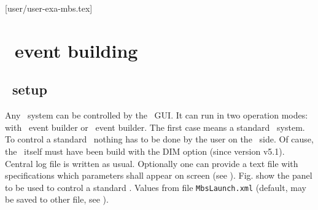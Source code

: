 [user/user-exa-mbs.tex]
\section[MBS event building]{\mbs\ event building}
\subsection[MBS setup]{\mbs\ setup}
Any \mbs\ system can be controlled by the \dabc\ GUI.
It can run in two operation modes: with \mbs\ event builder or \dabc\ event builder.
The first case means a standard \mbs\ system.
To control a standard \mbs\ nothing has to be done by the user on the \mbs\ side.
Of cause, the \mbs\ itself must have been build with the DIM option (since version v5.1).
Central log file is written as usual.
Optionally one can provide a text file with specifications which parameters
shall appear on screen (see ).
Fig.  show the panel to be used to control
a standard \mbs.
Values from file {\tt MbsLaunch.xml} (default, may be saved to other file,
see ).
